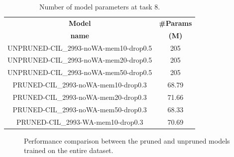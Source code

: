 \begin{table}[H]
    \centering
    \begin{tabular}{c|c}
        \hline
        \textbf{Model} &
        \textbf{\#Params} \\
        \textbf{name} &
        \textbf{(M)} \\
        \hline
        \hline
UNPRUNED-CIL\_2993-noWA-mem10-drop0.5&205\\
UNPRUNED-CIL\_2993-noWA-mem20-drop0.5&205\\
UNPRUNED-CIL\_2993-noWA-mem50-drop0.5&205\\
\hline
PRUNED-CIL\_2993-noWA-mem10-drop0.3&68.79\\
PRUNED-CIL\_2993-noWA-mem20-drop0.3&71.66\\
PRUNED-CIL\_2993-noWA-mem50-drop0.3&68.33\\
\hline
PRUNED-CIL\_2993-WA-mem10-drop0.3&70.69\\
        \hline
    \end{tabular}
	\caption{Number of model parameters at task 8.}%
    \label{table:exp7-params}
\end{table}

\begin{figure}[H]
	\centering
    \qquad
	\caption{Performance comparison between the pruned and unpruned models trained on the entire dataset.}%
	\label{fig:exp7}
\end{figure}

